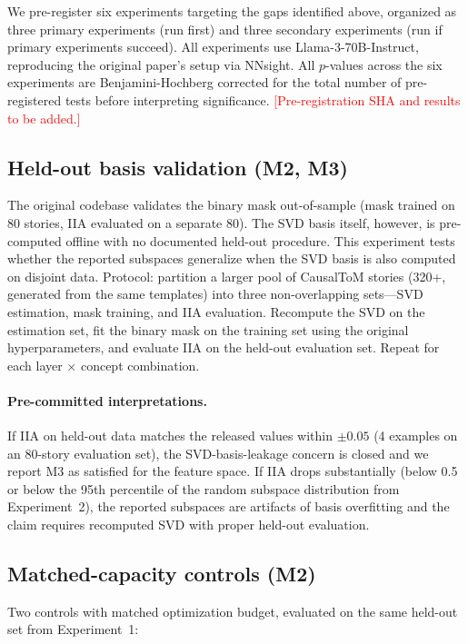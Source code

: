 \documentclass[11pt]{article}
\begin{document}
We pre-register six experiments targeting the gaps identified above, organized as three primary experiments (run first) and three secondary experiments (run if primary experiments succeed). All experiments use Llama-3-70B-Instruct, reproducing the original paper's setup via NNsight. All $p$-values across the six experiments are Benjamini-Hochberg corrected for the total number of pre-registered tests before interpreting significance. \textcolor{red}{[Pre-registration SHA and results to be added.]}

\subsection{Held-out basis validation (M2, M3)}

The original codebase validates the binary mask out-of-sample (mask trained on 80 stories, IIA evaluated on a separate 80). The SVD basis itself, however, is pre-computed offline with no documented held-out procedure. This experiment tests whether the reported subspaces generalize when the SVD basis is also computed on disjoint data. Protocol: partition a larger pool of CausalToM stories (320+, generated from the same templates) into three non-overlapping sets---SVD estimation, mask training, and IIA evaluation. Recompute the SVD on the estimation set, fit the binary mask on the training set using the original hyperparameters, and evaluate IIA on the held-out evaluation set. Repeat for each layer $\times$ concept combination.

\paragraph{Pre-committed interpretations.} If IIA on held-out data matches the released values within $\pm 0.05$ (4 examples on an 80-story evaluation set), the SVD-basis-leakage concern is closed and we report M3 as satisfied for the feature space. If IIA drops substantially (below 0.5 or below the 95th percentile of the random subspace distribution from Experiment~2), the reported subspaces are artifacts of basis overfitting and the claim requires recomputed SVD with proper held-out evaluation.

\subsection{Matched-capacity controls (M2)}

Two controls with matched optimization budget, evaluated on the same held-out set from Experiment~1:
\end{document}

